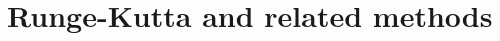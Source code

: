 \documentclass[../classnotes.tex]{subfiles}
\begin{document}
\chapter{Runge-Kutta and related methods}\label{ch:runge-kutta-and-related-methods}

\end{document}
